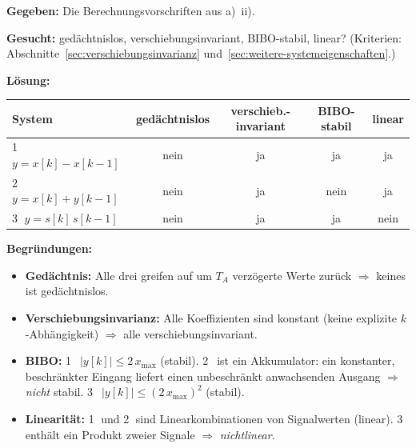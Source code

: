 \begin{beispiel}

\textbf{Gegeben:} Die Berechnungsvorschriften aus a)~ii).

\textbf{Gesucht:} gedächtnislos, verschiebungsinvariant, BIBO-stabil,
linear? (Kriterien: Abschnitte~\ref{sec:verschiebungsinvarianz}
und~\ref{sec:weitere-systemeigenschaften}.)

\textbf{Lösung:}

\begin{center}
\begin{tabular}{lcccc}
\toprule
System & gedächtnislos & verschieb.-invariant & BIBO-stabil & linear \\
\midrule
\textcircled{\footnotesize 1} $y=x[k]-x[k-1]$          & nein & ja & ja   & ja   \\
\textcircled{\footnotesize 2} $y=x[k]+y[k-1]$          & nein & ja & nein & ja   \\
\textcircled{\footnotesize 3} $y=s[k]\,s[k-1]$          & nein & ja & ja   & nein \\
\bottomrule
\end{tabular}
\end{center}

\textbf{Begründungen:}
\begin{itemize}
  \item \textbf{Gedächtnis:} Alle drei greifen auf um $T_A$ verzögerte Werte
        zurück $\Rightarrow$ keines ist gedächtnislos.
  \item \textbf{Verschiebungsinvarianz:} Alle Koeffizienten sind konstant
        (keine explizite $k$-Abhängigkeit) $\Rightarrow$ alle verschiebungsinvariant.
  \item \textbf{BIBO:} \textcircled{\footnotesize 1}~$|y[k]|\le 2\,x_{\max}$ (stabil). \textcircled{\footnotesize 2}~ist ein
        Akkumulator: ein konstanter, beschränkter Eingang liefert einen
        unbeschränkt anwachsenden Ausgang $\Rightarrow$ \emph{nicht} stabil.
        \textcircled{\footnotesize 3}~$|y[k]|\le (2\,x_{\max})^2$ (stabil).
  \item \textbf{Linearität:} \textcircled{\footnotesize 1} und \textcircled{\footnotesize 2} sind Linearkombinationen von
        Signalwerten (linear). \textcircled{\footnotesize 3} enthält ein Produkt zweier Signale
        $\Rightarrow$ \emph{nichtlinear}.
\end{itemize}

\end{beispiel}

